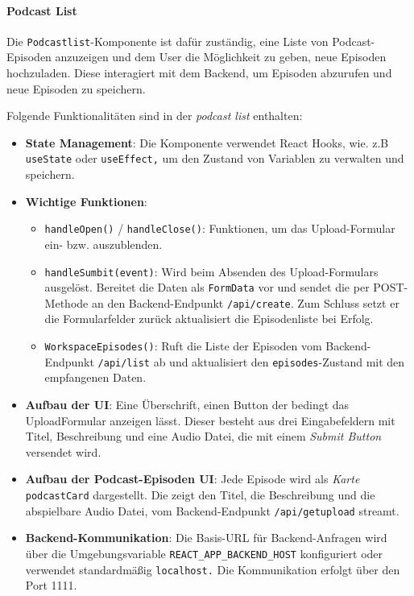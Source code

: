 \documentclass{article}
\begin{document}
\paragraph{Podcast List}
Die \texttt{Podcastlist}-Komponente ist dafür zuständig, eine Liste von Podcast-Episoden anzuzeigen und dem User die Möglichkeit zu geben, neue Episoden hochzuladen. Diese interagiert mit dem Backend, um Episoden abzurufen und neue Episoden zu speichern.

Folgende Funktionalitäten sind in der \textit{podcast list} enthalten:

\begin{itemize}
  \item \textbf{State Management}: Die Komponente verwendet React Hooks, wie. z.B \texttt{useState} oder \texttt{useEffect,} um den Zustand von Variablen zu verwalten und speichern.
  \item \textbf{Wichtige Funktionen}:
  \begin{itemize}
    \item \texttt{handleOpen()} / \texttt{handleClose()}: Funktionen, um das Upload-Formular ein- bzw. auszublenden.
    \item \texttt{handleSumbit(event)}: Wird beim Absenden des Upload-Formulars ausgelöst. Bereitet die Daten als \texttt{FormData} vor und sendet die per POST-Methode an den Backend-Endpunkt \texttt{/api/create}. Zum Schluss setzt er die Formularfelder zurück aktualisiert die Episodenliste bei Erfolg.
    \item \texttt{WorkspaceEpisodes()}: Ruft die Liste der Episoden vom Backend-Endpunkt \texttt{/api/list} ab und aktualisiert den \texttt{episodes}-Zustand mit den empfangenen Daten.
  \end{itemize}
\item \textbf{Aufbau der UI}: Eine Überschrift, einen Button der bedingt das UploadFormular anzeigen lässt. Dieser besteht aus drei Eingabefeldern mit Titel, Beschreibung und eine Audio Datei, die mit einem \textit{Submit Button} versendet wird.
\item \textbf{Aufbau der Podcast-Episoden UI}: Jede Episode wird als \textit{Karte} \texttt{podcastCard} dargestellt. Die zeigt den Titel, die Beschreibung und die abspielbare Audio Datei, vom Backend-Endpunkt \texttt{/api/getupload} streamt.
\item \textbf{Backend-Kommunikation}: Die Basis-URL für Backend-Anfragen wird über die Umgebungsvariable \texttt{REACT\_APP\_BACKEND\_HOST} konfiguriert oder verwendet standardmäßig \texttt{localhost.} Die Kommunikation erfolgt über den Port 1111.
\end{itemize}
\end{document}
